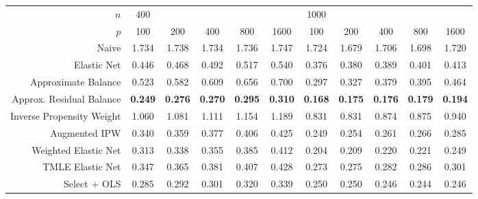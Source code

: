 \begin{table}[ht]
\centering
\begin{tabular}{|r|ccccc|ccccc|}
   \hline
$n$ & 400 &  &  &  &  & 1000 &  &  &  &  \\ 
  $p$ & 100 & 200 & 400 & 800 & 1600 & 100 & 200 & 400 & 800 & 1600 \\ 
   \hline
Naive & 1.734 & 1.738 & 1.734 & 1.736 & 1.747 & 1.724 & 1.679 & 1.706 & 1.698 & 1.720 \\ 
  Elastic Net & 0.446 & 0.468 & 0.492 & 0.517 & 0.540 & 0.376 & 0.380 & 0.389 & 0.401 & 0.413 \\ 
   \hline
Approximate Balance & 0.523 & 0.582 & 0.609 & 0.656 & 0.700 & 0.297 & 0.327 & 0.379 & 0.395 & 0.464 \\ 
  Approx. Residual Balance &  \bf 0.249 &  \bf 0.276 &  \bf 0.270 &  \bf 0.295 &  \bf 0.310 &  \bf 0.168 &  \bf 0.175 &  \bf 0.176 &  \bf 0.179 &  \bf 0.194 \\ 
   \hline
Inverse Propensity Weight & 1.060 & 1.081 & 1.111 & 1.154 & 1.189 & 0.831 & 0.831 & 0.874 & 0.875 & 0.940 \\ 
  Augmented IPW & 0.340 & 0.359 & 0.377 & 0.406 & 0.425 & 0.249 & 0.254 & 0.261 & 0.266 & 0.285 \\ 
   \hline
Weighted Elastic Net & 0.313 & 0.338 & 0.355 & 0.385 & 0.412 & 0.204 & 0.209 & 0.220 & 0.221 & 0.249 \\ 
  TMLE Elastic Net & 0.347 & 0.365 & 0.381 & 0.407 & 0.428 & 0.273 & 0.275 & 0.282 & 0.286 & 0.301 \\ 
   \hline
Select + OLS & 0.285 & 0.292 & 0.301 & 0.320 & 0.339 & 0.250 & 0.250 & 0.246 & 0.244 & 0.246 \\ 
   \hline
\end{tabular}
\end{table}
